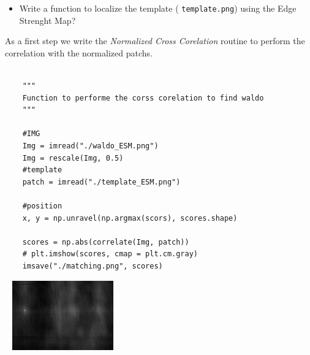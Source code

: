 \documentclass[a4paper]{tufte-handout}
\begin{document}
\begin{itemize}
  \item Write a function to localize  the template ( \texttt{template.png})
    using the Edge Strenght Map?
\end{itemize}

As a first step we write the \emph{Normalized Cross Corelation} routine to
perform the correlation with the normalized patchs.

\begin{center}
  \begin{verbatim}

    """
    Function to performe the corss corelation to find waldo
    """

    #IMG
    Img = imread("./waldo_ESM.png")
    Img = rescale(Img, 0.5)
    #template
    patch = imread("./template_ESM.png")

    #position
    x, y = np.unravel(np.argmax(scors), scores.shape)

    scores = np.abs(correlate(Img, patch))
    # plt.imshow(scores, cmap = plt.cm.gray)
    imsave("./matching.png", scores)

  \end{verbatim}
\end{center}


\begin{marginfigure}
  \centering
  \includegraphics[width=5cm, height=3cm]{./matching.png}
\end{marginfigure}
\end{document}

